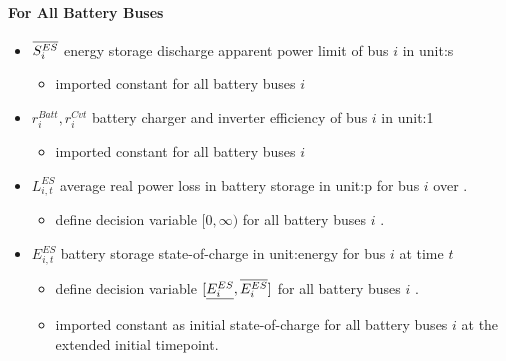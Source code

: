 \paragraph{For All Battery Buses}
\begin{itemize}

\item $\overline{S^{ES}_i}$ energy storage discharge apparent power limit of bus $i$
  in \gls{unit:s} \begin{itemize} \item \gls{imported} constant for all battery
  buses $i$ \end{itemize}

\item $r^{Batt}_i, r^{Cvt}_i$ battery charger and inverter efficiency of bus $i$
  in \gls{unit:1} \begin{itemize} \item \gls{imported} constant for all battery
  buses $i$ \end{itemize}

\item $L^{ES}_{i,t}$ average real power loss in battery storage in \gls{unit:p}
      for bus $i$ over \intervaloft{}.

\begin{itemize} \item \gls{define} decision variable $[0, \infty)$ for all
  battery buses $i$ \atallt{}.  \end{itemize}

\item $E^{ES}_{i,t}$ battery storage state-of-charge in \gls{unit:energy}
for bus $i$ at time $t$

\begin{itemize} \item \gls{define} decision variable
  $[\underline{E^{ES}_i}, \overline{E^{ES}_i}]$ for all battery buses $i$ \atallt{}.

\item \gls{imported} constant as initial
  state-of-charge for all battery buses $i$ at the extended initial
  timepoint.  \end{itemize}

\end{itemize}
